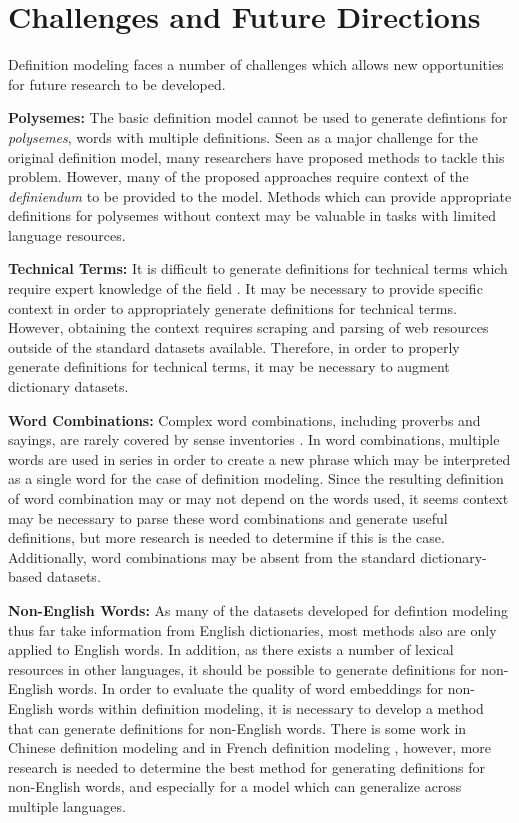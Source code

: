 \section{Challenges and Future Directions}
Definition modeling faces a number of challenges which allows new opportunities
for future research to be developed.

\textbf{Polysemes:} The basic definition model cannot be used to generate
defintions for \textit{polysemes}, words with multiple definitions. Seen as a
major challenge for the original definition model, many researchers have
proposed methods to tackle this problem. However, many of the proposed
approaches require context of the \textit{definiendum} to be provided to the
model. Methods which can provide appropriate definitions for polysemes without
context may be valuable in tasks with limited language resources.

\textbf{Technical Terms:} It is difficult to generate definitions for technical
terms which require expert knowledge of the field \cite{huang_cdm_2021}. It may
be necessary to provide specific context in order to appropriately generate
definitions for technical terms. However, obtaining the context requires
scraping and parsing of web resources outside of the standard datasets
available. Therefore, in order to properly generate definitions for technical
terms, it may be necessary to augment dictionary datasets.

\textbf{Word Combinations:} Complex word combinations, including proverbs and
sayings, are rarely covered by sense inventories
\cite{bevilacqua_generationary_2020}. In word combinations, multiple words are
used in series in order to create a new phrase which may be interpreted as a
single word for the case of definition modeling. Since the resulting definition
of  word combination may or may not depend on the words used, it seems context
may be necessary to parse these word combinations and generate useful
definitions, but more research is needed to determine if this is the case.
Additionally, word combinations may be absent from the standard dictionary-based
datasets.

\textbf{Non-English Words:} As many of the datasets developed for defintion
modeling thus far take information from English dictionaries, most methods also
are only applied to English words. In addition, as there exists a number of lexical
resources in other languages, it should be possible to generate definitions for
non-English words. In order to evaluate the quality of word embeddings for
non-English words within definition modeling, it is necessary to develop a
method that can generate definitions for non-English words. There is some work
in Chinese definition modeling \cite{zheng_decompose_2021} and in French
definition modeling \cite{reid_vcdm_2020}, however, more research is needed to
determine the best method for generating definitions for non-English words, and
especially for a model which can generalize across multiple languages.

